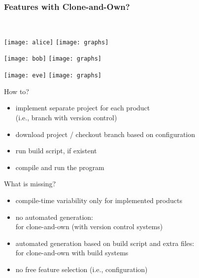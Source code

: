 \subsubsection{Features with Clone-and-Own?}
\begin{frame}{\myframetitle}
	\begin{mycolumns}[widths={30}]
		\centering~

		\texttt{[image: alice]}
		\texttt{[image: graphs]}

		\texttt{[image: bob]}
		\texttt{[image: graphs]}

		\texttt{[image: eve]}
		\texttt{[image: graphs]}
	\mynextcolumn
		\begin{definition}{How to?}
			\begin{itemize}
				\item implement separate project for each product\\(i.e., branch with version control)
				\item download project / checkout branch based on configuration
				\item run build script, if existent
				\item compile and run the program
			\end{itemize}
		\end{definition}
		\begin{note}{What is missing?}
			\begin{itemize}
				\item compile-time variability only for implemented products
				\item no automated generation:\\\hfill for clone-and-own (with version control systems)
				\item automated generation based on build script and extra files:\\\hfill for clone-and-own with build systems
				\item no free feature selection (i.e., configuration)
			\end{itemize}
		\end{note}
	\end{mycolumns}
\end{frame}

